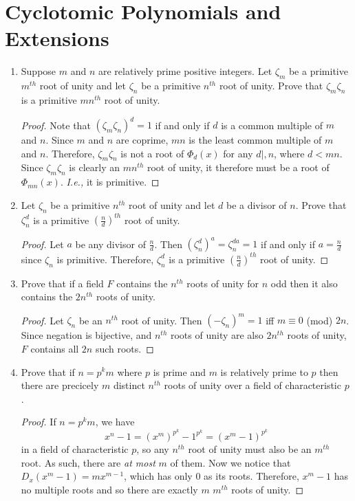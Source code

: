 \documentclass{report}
\begin{document}
\section{Cyclotomic Polynomials and Extensions}
\begin{enumerate} 
	\item Suppose $m$ and $n$ are relatively prime positive integers. Let $\zeta_m$ be a primitive $m^{th}$ root of unity and let $\zeta_n$ be a primitive $n^{th}$ root of unity.
		Prove that $\zeta_m\zeta_n$ is a primitive $mn^{th}$ root of unity.
		\begin{proof}
			Note that $(\zeta_m\zeta_n)^d=1$ if and only if $d$ is a common multiple of $m$ and $n$.
			Since $m$ and $n$ are coprime, $mn$ is the least common multiple of $m$ and $n$.
			Therefore, $\zeta_m\zeta_n$ is not a root of $\Phi_d(x)$ for any $d|,n$, where $d<mn$.
			Since $\zeta_m\zeta_n$ is clearly an $mn^{th}$ root of unity, it therefore must be a root of $\Phi_{mn}(x)$. \textit{I.e.,} it is primitive.
		\end{proof}
	\item Let $\zeta_n$ be a primitive $n^{th}$ root of unity and let $d $ be a divisor of $n$. Prove that $\zeta^d_n$ is a primitive $(\frac{n}{d})^{th}$ root of unity.
		\begin{proof}
			Let $a$ be any divisor of $\frac{n}{d}$. Then $(\zeta_n^d)^a=\zeta_n^{da}=1$ if and only if $a=\frac{n}{d}$ since $\zeta_n$ is primitive.
			Therefore, $\zeta_n^d$ is a primitive $(\frac{n}{d})^{th}$ root of unity.
		\end{proof}
	\item Prove that if a field $F$ contains the $n^{th}$ roots of unity for $n$ odd then it also contains the $2n^{th}$ roots of unity.
		\begin{proof}
			Let $\zeta_n$ be an $n^{th}$ root of unity. Then $(-\zeta_n)^m=1$ iff $m\equiv 0$ (mod) $2n$.
			Since negation is bijective, and $n^{th}$ roots of unity are also $2n^{th}$ roots of unity, $F$ contains all $2n$ such roots.
		\end{proof}
	\item Prove that if $n=p^km$ where $p$ is prime and $m$ is relatively prime to $p$ then there are precicely $m$ distinct $n^{th}$ roots of unity over a field of characteristic $p$.
		\begin{proof}
			If $n=p^km$, we have
			$$x^{n}-1=(x^{m})^{p^k}-1^{p^k}=(x^m-1)^{p^k}$$
			in a field of characteristic $p$, so any $n^{th}$ root of unity must also be an $m^{th}$ root. As such, there are \textit{at most} $m$ of them.
			Now we notice that $D_x(x^m-1)=mx^{m-1}$, which has only $0$ as its roots. Therefore, $x^m-1$ has no multiple roots and so there are exactly $m$ $m^{th}$ roots of unity.
		\end{proof}
		

\end{enumerate}
\end{document}
